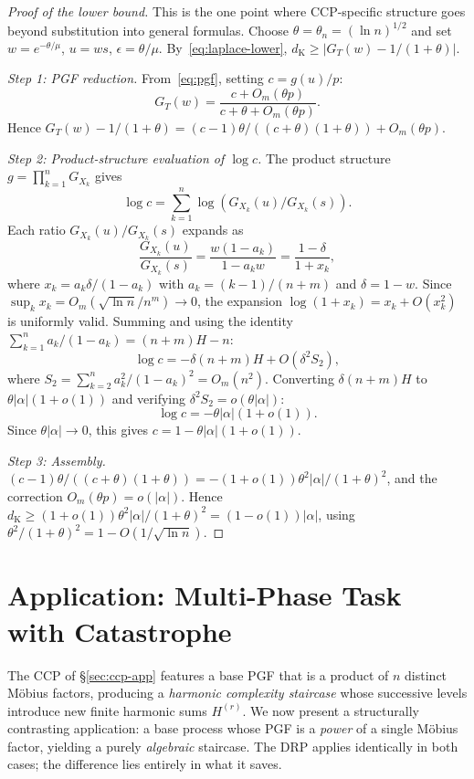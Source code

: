 \documentclass[11pt]{article}
\theoremstyle{plain}
\theoremstyle{definition}
\theoremstyle{remark}
\newcommand{\dK}{d_{\mathrm{K}}}
\begin{document}
\begin{proof}[Proof of the lower bound]
This is the one point where CCP-specific structure goes beyond substitution into general formulas.  Choose $\theta = \theta_n = (\ln n)^{1/2}$ and set $w = e^{-\theta/\mu}$, $u = ws$, $\epsilon = \theta/\mu$.  By~\eqref{eq:laplace-lower}, $\dK \geq |G_T(w) - 1/(1+\theta)|$.

\emph{Step 1: PGF reduction.}\;
From~\eqref{eq:pgf}, setting $c = g(u)/p$:
\[
  G_T(w) = \frac{c + O_m(\theta p)}{c + \theta + O_m(\theta p)}.
\]
Hence $G_T(w) - 1/(1+\theta) = (c-1)\theta/((c+\theta)(1+\theta)) + O_m(\theta p)$.

\emph{Step 2: Product-structure evaluation of $\log c$.}\;
The product structure $g = \prod_{k=1}^n G_{X_k}$ gives 
\[\log c = \sum_{k=1}^n \log(G_{X_k}(u)/G_{X_k}(s)).\]  
Each ratio $G_{X_k}(u)/G_{X_k}(s)$ expands as 
\[
  \frac{G_{X_k}(u)}{G_{X_k}(s)}
  =
  \frac{w(1-a_k)}{1-a_k w}=\frac{1-\delta}{1+x_k},
\]
where $x_k = a_k\delta/(1-a_k)$ with $a_k = (k{-}1)/(n{+}m)$ and $\delta = 1 - w$.  Since $\sup_k x_k = O_m(\sqrt{\ln n}/n^m) \to 0$, the expansion $\log(1+x_k) = x_k + O(x_k^2)$ is uniformly valid.  Summing and using the identity $\sum_{k=1}^n a_k/(1-a_k) = (n+m)H - n$:
\[
  \log c = -\delta(n+m)H + O(\delta^2 S_2),
\]
where $S_2 = \sum_{k=2}^n a_k^2/(1-a_k)^2 = O_m(n^2)$.  Converting $\delta(n+m)H$ to $\theta|\alpha|(1+o(1))$ and verifying $\delta^2 S_2 = o(\theta|\alpha|)$:
\[
  \log c = -\theta|\alpha|(1+o(1)).
\]
Since $\theta|\alpha| \to 0$, this gives $c = 1 - \theta|\alpha|(1+o(1))$.

\emph{Step 3: Assembly.}\;
$(c-1)\theta/((c+\theta)(1+\theta)) = -(1+o(1))\theta^2|\alpha|/(1+\theta)^2$, and the correction $O_m(\theta p) = o(|\alpha|)$.  Hence $\dK \geq (1+o(1))\theta^2|\alpha|/(1+\theta)^2 = (1-o(1))|\alpha|$, using $\theta^2/(1+\theta)^2 = 1 - O(1/\sqrt{\ln n})$.
\end{proof}




\section{Application: Multi-Phase Task with Catastrophe}\label{sec:multiphase}

The CCP of \S\ref{sec:ccp-app} features a base PGF that is a product of $n$ distinct M\"obius factors, producing a \emph{harmonic complexity staircase} whose successive levels introduce new finite harmonic sums $H^{(r)}$.  We now present a structurally contrasting application: a base process whose PGF is a \emph{power} of a single M\"obius factor, yielding a purely \emph{algebraic} staircase.  The DRP applies identically in both cases; the difference lies entirely in what it saves.
\end{document}
